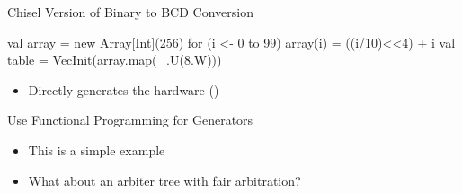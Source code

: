\begin{frame}[fragile]{Chisel Version of Binary to BCD Conversion}
\begin{chisel}
  val array = new Array[Int](256)
  for (i <- 0 to 99) {
    array(i) = ((i/10)<<4) + i%
  }
  val table = VecInit(array.map(_.U(8.W)))
\end{chisel}
\begin{itemize}
\item Directly generates the hardware ()
\end{itemize}
\end{frame}

\begin{frame}[fragile]{Use Functional Programming for Generators}
\begin{itemize}
\item This is a simple example
\item What about an arbiter tree with fair arbitration?
\end{itemize}
\end{frame}

%

